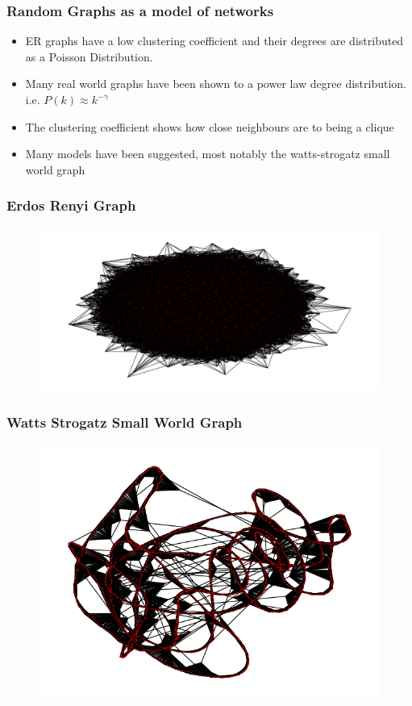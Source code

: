 \documentclass{beamer}
\begin{document}
\begin{frame}
\frametitle{Random Graphs as a model of networks}
\begin{itemize}
\item ER graphs have a low clustering coefficient and their degrees are distributed as a Poisson Distribution.
\item Many real world graphs have been shown to a power law degree distribution. i.e. $P(k) \approx k^{-\gamma}$
\item The clustering coefficient shows how close neighbours are to being a clique
\item Many models have been suggested, most notably the watts-strogatz small world graph
\end{itemize}
\end{frame}



\begin{frame}
\frametitle{Erdos Renyi Graph}
\begin{figure}
\includegraphics[width=\textwidth,height=\textheight,keepaspectratio]{Gnp_connectivity_graph}
\end{figure}
\end{frame}


\begin{frame}
\frametitle{Watts Strogatz Small World Graph}
\begin{figure}
\includegraphics[width=\textwidth,height=\textheight,keepaspectratio]{watts_strogatz_connectivity_graph}
\end{figure}
\end{frame}
\end{document}
